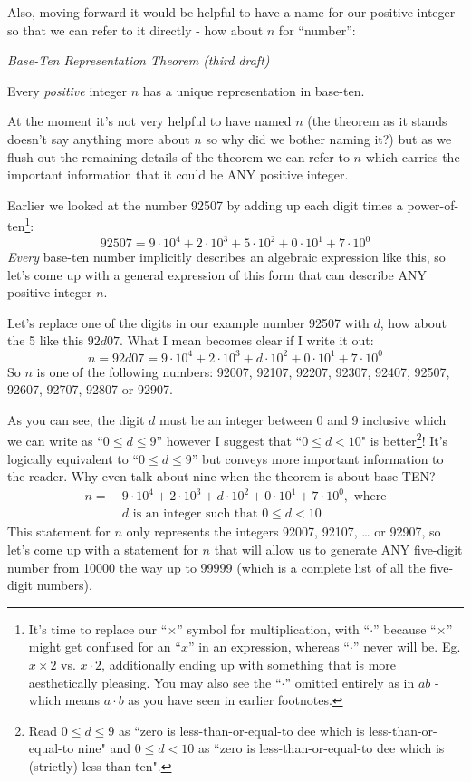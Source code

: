 \documentclass{article}
\newenvironment{jprIn}{\begin{adjustwidth}{2em}{}}{\end{adjustwidth}}
\begin{document}
Also, moving forward it would be helpful to have a name for our 
positive integer so that we can refer to it directly - how about $n$ for ``number'':

\emph{Base-Ten Representation Theorem (third draft)}
\begin{jprIn}
Every \emph{positive} integer $n$ has a unique representation in base-ten.
\end{jprIn}

At the moment it's not very helpful to have named $n$ (the theorem as it stands
doesn't say anything more about $n$ so why did we bother naming it?) but
as we flush out the remaining details of the theorem
we can refer to $n$ which carries the important information that it could be ANY positive integer.

Earlier we looked at the number 92507 by adding up
each digit times a power-of-ten\footnote{It's time
to replace our ``$\times{}$'' symbol for multiplication, with ``$\cdot{}$''
because ``$\times{}$'' might get confused for an ``$x$'' in an expression,
whereas ``$\cdot{}$'' never will be. Eg. $x\times{}2$
vs. $x\cdot{}2$, additionally ending up with something that is more aesthetically pleasing.
You may also see the ``$\cdot$'' omitted entirely as
in $ab$ - which means $a\cdot{}b$ as you have seen in earlier footnotes.}:
\[92507=9{\cdot}10^4+2{\cdot}10^3+5{\cdot}10^2+0{\cdot}10^1+7{\cdot}10^0\]
\emph{Every} base-ten number implicitly describes an algebraic expression like this, so
let's come up
with a general expression of this form that can describe ANY positive integer $n$.

Let's replace one of the digits in our example number 92507 with $d$, how about the 5 like this $92d07$. What I
mean becomes clear if I write it out:
\[n=92d07=9{\cdot}10^4+2{\cdot}10^3+d{\cdot}10^2+0{\cdot}10^1+7{\cdot}10^0\]
So $n$ is one of the following numbers:
92007,
92107,
92207,
92307,
92407,
92507,
92607,
92707,
92807 or
92907.

As you can see, the digit $d$ must be an integer between 0 and 9 inclusive 
which we can write as ``$0\le{}d\le{}9$'' however I suggest that ``$0\le{}d<10$" is better\footnote{Read 
$0\le{}d\le{}9$ as ``zero is less-than-or-equal-to dee which is less-than-or-equal-to nine"
and $0\le{}d<10$ as ``zero is less-than-or-equal-to dee which is (strictly) less-than ten".}!
It's logically equivalent to ``$0\le{}d\le{}9$''  but conveys more important information
to the reader. Why even talk about nine when the theorem is about base TEN?
\begin{align*}
n =\ &9{\cdot}10^4+2{\cdot}10^3+d{\cdot}10^2+0{\cdot}10^1+7{\cdot}10^0,\text{ where}\\
&d\text{ is an integer such that }0\le{}d<10
\end{align*}
This statement for $n$ only represents the integers 92007, 92107, \dots{} or 92907, so let's come up
with a statement for $n$ that will allow us to generate ANY five-digit number from 10000 
the way up to 99999 (which is a complete list of all the five-digit numbers).
\end{document}
